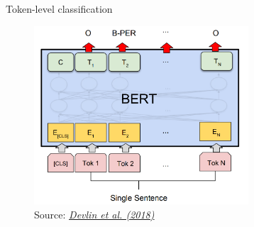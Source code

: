 
\begin{vbframe}{Token-level classification}

\vfill

	\begin{figure}
		\centering
		\includegraphics[width = 8cm]{figure/toklevel.png}\\ 
		\footnotesize{Source:} \href{https://arxiv.org/pdf/1810.04805.pdf}{\footnotesize \it Devlin et al. (2018)}
	\end{figure}

\vfill

\end{vbframe}


